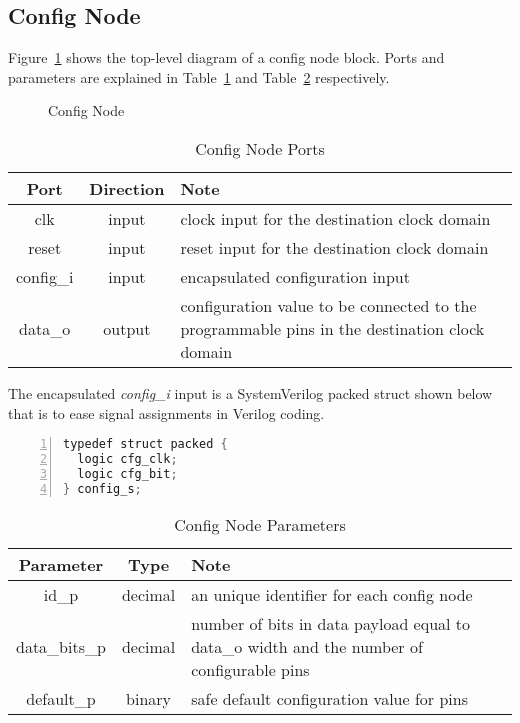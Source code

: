 \documentclass[12pt]{article}
\newcommand{\reffig}[1]{Figure~\ref{#1}}
\newcommand{\reftab}[1]{Table~\ref{#1}}
\begin{document}
\subsection{Config Node} \label{config-node}
\reffig{fig:config-node} shows the top-level diagram of a config node block.
Ports and parameters are explained in \reftab{tab:ports} and
\reftab{tab:params} respectively.

\begin{figure}[h]
\centering

\caption{Config Node}
\label{fig:config-node}
\end{figure}

\begin{table}[h]
\centering
  \begin{tabular}{ | c | c | p{9cm} | }
  \hline
    Port & Direction & Note \\ \hline
    clk & input & clock input for the destination clock domain \\ \hline
    reset & input & reset input for the destination clock domain \\ \hline
    config\_i & input & encapsulated configuration input \\ \hline
    data\_o & output & configuration value to be connected to the programmable pins
                       in the destination clock domain \\ \hline
  \end{tabular}
\caption{Config Node Ports}
\label{tab:ports}
\end{table}

The encapsulated \textit{config\_i} input is a SystemVerilog packed struct
shown below that is to ease signal assignments in Verilog coding.
\begin{lstlisting}[language=Verilog, basicstyle=\footnotesize, numbers=left, frame=single, numberstyle=\tiny]
typedef struct packed {
  logic cfg_clk;
  logic cfg_bit;
} config_s;
\end{lstlisting}

\begin{table}[h]
\centering
  \begin{tabular}{ | c | c | p{9cm} | }
  \hline
    Parameter & Type & Note \\ \hline
    id\_p & decimal & an unique identifier for each config node \\ \hline
    data\_bits\_p & decimal & number of bits in data payload
                            equal to data\_o width and the number of configurable pins \\ \hline
    default\_p & binary & safe default configuration value for pins \\ \hline
  \end{tabular}
\caption{Config Node Parameters}
\label{tab:params}
\end{table}
\end{document}
